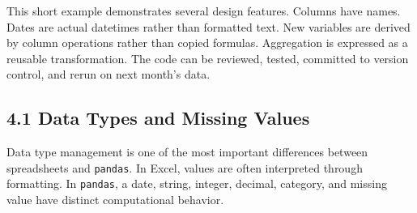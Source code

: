 \documentclass[
  12pt,
]{article}
\begin{document}
This short example demonstrates several design features. Columns have
names. Dates are actual datetimes rather than formatted text. New
variables are derived by column operations rather than copied formulas.
Aggregation is expressed as a reusable transformation. The code can be
reviewed, tested, committed to version control, and rerun on next
month's data.

\subsection{4.1 Data Types and Missing
Values}\label{data-types-and-missing-values}

Data type management is one of the most important differences between
spreadsheets and \texttt{pandas}. In Excel, values are often interpreted
through formatting. In \texttt{pandas}, a date, string, integer,
decimal, category, and missing value have distinct computational
behavior.
\end{document}
